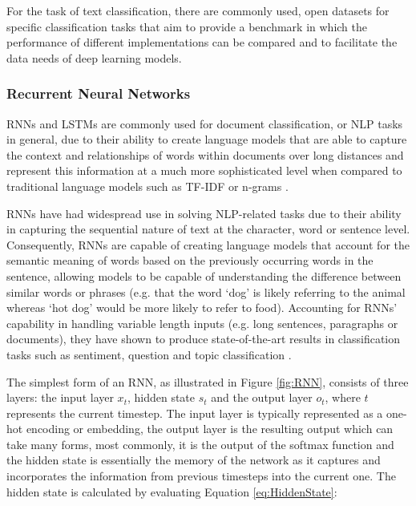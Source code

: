 \documentclass[a4paper,twoside,phd]{BYUPhys}
\begin{document}
For the task of text classification, there are commonly used, open datasets for specific classification tasks that aim to provide a benchmark in which the performance of different implementations can be compared and to facilitate the data needs of deep learning models. 

\subsubsection{Recurrent Neural Networks}
\label{sec:RNN}

RNNs and LSTMs are commonly used for document classification, or NLP tasks in general, due to their ability to create language models that are able to capture the context and relationships of words within documents over long distances and represent this information at a much more sophisticated level when compared to traditional language models such as TF-IDF or n-grams \cite{Young}. \newline
 
RNNs have had widespread use in solving NLP-related tasks due to their ability in capturing the sequential nature of text at the character, word or sentence level. Consequently, RNNs are capable of creating language models that account for the semantic meaning of words based on the previously occurring words in the sentence, allowing models to be capable of understanding the difference between similar words or phrases (e.g. that the word `dog' is likely referring to the animal whereas `hot dog' would be more likely to refer to food). Accounting for RNNs' capability in handling variable length inputs (e.g. long sentences, paragraphs or documents), they have shown to produce state-of-the-art results in classification tasks such as sentiment, question and topic classification \cite{Howard2018}.\newline

The simplest form of an RNN, as illustrated in Figure \ref{fig:RNN}, consists of three layers: the input layer $x_t$, hidden state $s_t$ and the output layer $o_t$, where $t$ represents the current timestep. The input layer is typically represented as a one-hot encoding or embedding, the output layer is the resulting output which can take many forms, most commonly, it is the output of the softmax function and the hidden state is essentially the memory of the network as it captures and incorporates the information from previous timesteps into the current one. The hidden state is calculated by evaluating Equation \ref{eq:HiddenState}:
\end{document}
